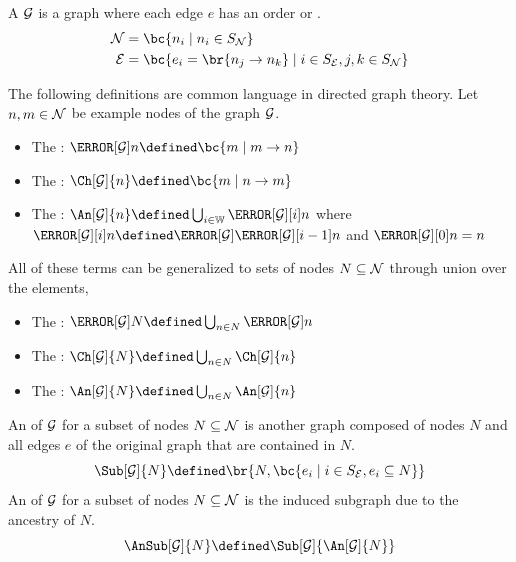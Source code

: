 \documentclass[aps, 10pt, english, twoside, pra, nofootinbib, longbibliography]{revtex4-1}
\begin{document}
    \begin{definition}
        \label{def:directed_graph}
        A  $\mathcal{G}$ is a graph where each edge $e$ has an order or .
        \begin{align*}
            \nodes &= \bc{n_i \mid n_i \in \ind_{\nodes}} \\
            \edges &= \bc{e_i = \br{n_j \to n_k} \mid i \in \ind_{\edges}, j,k \in \ind_{\nodes}}
        \end{align*}
    \end{definition}

    \begin{definition}
        \label{def:graph_terms}
        The following definitions are common language in directed graph theory. Let $n, m \in \mathcal{N}$ be example nodes of the graph $\mathcal{G}$.
        \begin{itemize}
            \item The : $\Pa[\graph]{n} \defined \bc{m \mid m \to n}$
            \item The : $\Ch[\graph]{n} \defined \bc{m \mid n \to m}$
            \item The : $\An[\graph]{n} \defined \bigcup_{i\in\mathbb{W}} \Pa[\graph][i]{n}$ where $\Pa[\graph][i]{n} \defined \Pa[\graph]{\Pa[\graph][i-1]{n}}$ and $\Pa[\graph][0]{n} = n$
        \end{itemize}
        All of these terms can be generalized to sets of nodes $N \subseteq \mathcal{N}$ through union over the elements,
        \begin{itemize}
            \item The : $\Pa[\graph]{N} \defined \bigcup_{n\in N}\Pa[\graph]{n}$
            \item The : $\Ch[\graph]{N} \defined \bigcup_{n\in N}\Ch[\graph]{n}$
            \item The : $\An[\graph]{N} \defined \bigcup_{n\in N}\An[\graph]{n}$
        \end{itemize}
    \end{definition}

    \begin{definition}
        An  of $\mathcal{G}$ for a subset of nodes $N \subseteq \mathcal{N}$ is another graph composed of nodes $N$ and all edges $e$ of the original graph that are contained in $N$.
        \[ \Sub[\graph]{N} \defined \br{N, \bc{e_i \mid i \in \ind_\edges, e_i \subseteq N}} \]
        An  of $\mathcal{G}$ for a subset of nodes $N \subseteq \mathcal{N}$ is the induced subgraph due to the ancestry of $N$.
        \[ \AnSub[\graph]{N} \defined \Sub[\graph]{\An[\graph]{N}} \]
    \end{definition}
\end{document}
